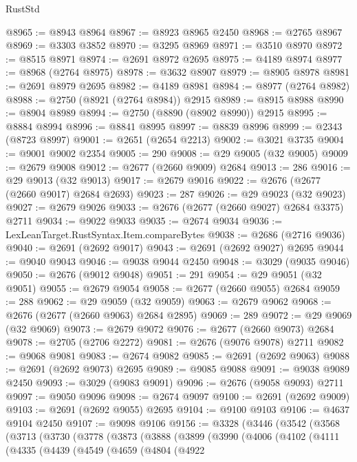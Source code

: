\begin{lexlean}{RustStd}
\begin{coremodule}
{\begin{coremodule}
{{{{{{{{{{{{{{{{{{{{{{{{{{{{{{{{{{{{{{{{{{{{{{{{{{{{{{{@8965 := @8943 @8964
@8967 := @8923 @8965 @2450
@8968 := @2765 @8967
@8969 := @3303 @3852
@8970 := @3295 @8969
@8971 := @3510 @8970
@8972 := @8515 @8971
@8974 := @2691 @8972 @2695
@8975 := @4189 @8974
@8977 := @8968 (@2764 @8975)
@8978 := @3632 @8907
@8979 := @8905 @8978
@8981 := @2691 @8979 @2695
@8982 := @4189 @8981
@8984 := @8977 (@2764 @8982)
@8988 := @2750 (@8921 (@2764 @8984)) @2915
@8989 := @8915 @8988
@8990 := @8904 @8989
@8994 := @2750 (@8890 (@8902 @8990)) @2915
@8995 := @8884 @8994
@8996 := @8841 @8995
@8997 := @8839 @8996
@8999 := @2343 (@8723 @8997)
@9001 := @2651 (@2654 @2213)
@9002 := @3021 @3735
@9004 := @9001 @9002 @2354
@9005 := 290
@9008 := @29 @9005 (@32 @9005)
@9009 := @2679 @9008
@9012 := @2677 (@2660 @9009) @2684
@9013 := 286
@9016 := @29 @9013 (@32 @9013)
@9017 := @2679 @9016
@9022 := @2676 (@2677 (@2660 @9017) @2684 @2693)
@9023 := 287
@9026 := @29 @9023 (@32 @9023)
@9027 := @2679 @9026
@9033 := @2676 (@2677 (@2660 @9027) @2684 @3375) @2711
@9034 := @9022 @9033
@9035 := @2674 @9034
@9036 := LexLeanTarget.RustSyntax.Item.compareBytes
@9038 := @2686 (@2716 @9036)
@9040 := @2691 (@2692 @9017)
@9043 := @2691 (@2692 @9027) @2695
@9044 := @9040 @9043
@9046 := @9038 @9044 @2450
@9048 := @3029 (@9035 @9046)
@9050 := @2676 (@9012 @9048)
@9051 := 291
@9054 := @29 @9051 (@32 @9051)
@9055 := @2679 @9054
@9058 := @2677 (@2660 @9055) @2684
@9059 := 288
@9062 := @29 @9059 (@32 @9059)
@9063 := @2679 @9062
@9068 := @2676 (@2677 (@2660 @9063) @2684 @2895)
@9069 := 289
@9072 := @29 @9069 (@32 @9069)
@9073 := @2679 @9072
@9076 := @2677 (@2660 @9073) @2684
@9078 := @2705 (@2706 @2272)
@9081 := @2676 (@9076 @9078) @2711
@9082 := @9068 @9081
@9083 := @2674 @9082
@9085 := @2691 (@2692 @9063)
@9088 := @2691 (@2692 @9073) @2695
@9089 := @9085 @9088
@9091 := @9038 @9089 @2450
@9093 := @3029 (@9083 @9091)
@9096 := @2676 (@9058 @9093) @2711
@9097 := @9050 @9096
@9098 := @2674 @9097
@9100 := @2691 (@2692 @9009)
@9103 := @2691 (@2692 @9055) @2695
@9104 := @9100 @9103
@9106 := @4637 @9104 @2450
@9107 := @9098 @9106
@9156 := @3328
    (@3446
      (@3542
        (@3568
          (@3713
            (@3730
              (@3778
                (@3873
                  (@3888
                    (@3899
                      (@3990
                        (@4006
                          (@4102
                            (@4111
                              (@4335
                                (@4439
                                  (@4549
                                    (@4659
                                      (@4804
                                        (@4922
}}}}}}}}}}}}}}}}}}}}}}}}}}}}}}}}}}}}}}}}}}}}}}}}}}}}}}}
\end{coremodule}}
\end{coremodule}
\end{lexlean}
